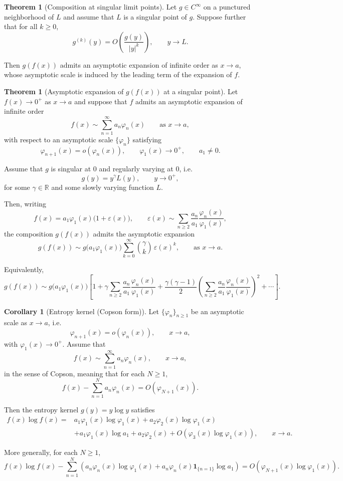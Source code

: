\documentclass{article}
\theoremstyle{definition}
\newtheorem{appendixtheorem}[appendixdefinition]{Theorem}
\newtheorem{appendixcorollary}[appendixdefinition]{Corollary}
\begin{document}
\begin{appendices}
\begin{appendixtheorem}[Composition at singular limit points]
Let $g\in C^\infty$ on a punctured neighborhood of $L$ and assume that $L$ is a
singular point of $g$. Suppose further that for all $k\ge0$,
\[
g^{(k)}(y)
=
O\!\left(\frac{g(y)}{|y|^k}\right),
\qquad y\to L.
\]

Then $g(f(x))$ admits an asymptotic expansion of infinite order as $x\to a$,
whose asymptotic scale is induced by the leading term of the expansion of $f$.
\end{appendixtheorem}

\begin{appendixtheorem}[Asymptotic expansion of $g(f(x))$ at a singular point]
Let $f(x)\to0^+$ as $x\to a$ and suppose that $f$ admits an asymptotic expansion
of infinite order
\[
f(x)\sim \sum_{n=1}^\infty a_n \varphi_n(x)
\qquad \text{as } x\to a,
\]
with respect to an asymptotic scale $\{\varphi_n\}$ satisfying
\[
\varphi_{n+1}(x)=o(\varphi_n(x)),
\qquad \varphi_1(x)\to0^+,
\qquad a_1\neq0.
\]

Assume that $g$ is singular at $0$ and regularly varying at $0$, i.e.
\[
g(y)=y^{\gamma}L(y), \qquad y\to0^+,
\]
for some $\gamma\in\mathbb{R}$ and some slowly varying function $L$.

Then, writing
\[
f(x)
=
a_1\varphi_1(x)\bigl(1+\varepsilon(x)\bigr),
\qquad
\varepsilon(x)
\sim
\sum_{n\ge2}\frac{a_n}{a_1}\frac{\varphi_n(x)}{\varphi_1(x)},
\]
the composition $g(f(x))$ admits the asymptotic expansion
\[
g(f(x))
\sim
g\bigl(a_1\varphi_1(x)\bigr)
\sum_{k=0}^\infty
\binom{\gamma}{k}\,\varepsilon(x)^k,
\qquad \text{as }x\to a.
\]

Equivalently,
\[
g(f(x))
\sim
g\bigl(a_1\varphi_1(x)\bigr)
\left[
1
+
\gamma\sum_{n\ge2}\frac{a_n}{a_1}\frac{\varphi_n(x)}{\varphi_1(x)}
+
\frac{\gamma(\gamma-1)}{2}
\left(\sum_{n\ge2}\frac{a_n}{a_1}\frac{\varphi_n(x)}{\varphi_1(x)}\right)^2
+\cdots
\right].
\]
\end{appendixtheorem}

\begin{appendixcorollary}[Entropy kernel (Copson form)]
Let $\{\varphi_n\}_{n\ge1}$ be an asymptotic scale as $x\to a$, i.e.
\[
\varphi_{n+1}(x)=o(\varphi_n(x)),
\qquad x\to a,
\]
with $\varphi_1(x)\to0^+$.
Assume that
\[
f(x)\sim \sum_{n=1}^\infty a_n \varphi_n(x),
\qquad x\to a,
\]
in the sense of Copson, meaning that for each $N\ge1$,
\[
f(x)-\sum_{n=1}^N a_n\varphi_n(x)=O\!\left(\varphi_{N+1}(x)\right).
\]

Then the entropy kernel $g(y)=y\log y$ satisfies
\[
\begin{aligned}
f(x)\log f(x)
={}&
a_1\varphi_1(x)\log\varphi_1(x)
+
a_2\varphi_2(x)\log\varphi_1(x)
\\
&+
a_1\varphi_1(x)\log a_1
+
a_2\varphi_2(x)
+
O\!\left(\varphi_3(x)\log\varphi_1(x)\right),
\qquad x\to a.
\end{aligned}
\]

More generally, for each $N\ge1$,
\[
f(x)\log f(x)
-
\sum_{n=1}^N
\left(
a_n\varphi_n(x)\log\varphi_1(x)
+
a_n\varphi_n(x)\mathbf{1}_{\{n=1\}}\log a_1
\right)
=
O\!\left(\varphi_{N+1}(x)\log\varphi_1(x)\right).
\]
\end{appendixcorollary}
\fi

\end{appendices}
\end{document}

